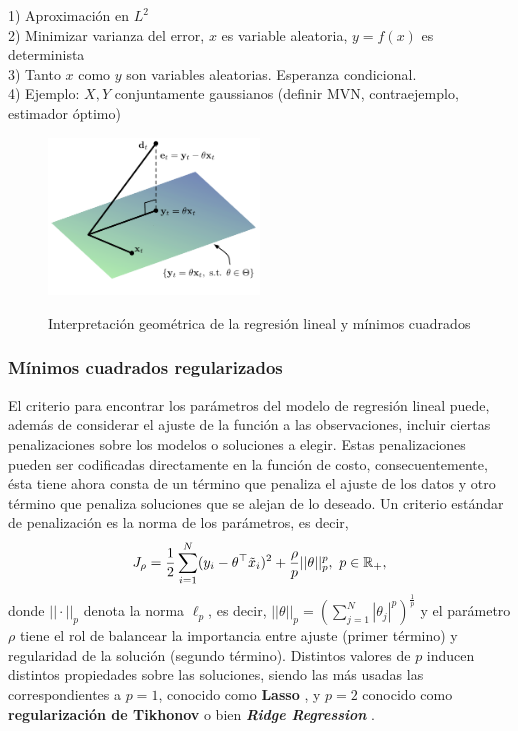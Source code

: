 \begin{mdframed}[style=pendiente, frametitle={\center ¿Por qué usamos el criterio de mínimos cuadrados?}]
1) Aproximación en $L^2$\\
2) Minimizar varianza del error, $x$ es variable aleatoria, $y=f(x)$ es determinista\\
3) Tanto $x$ como $y$ son variables aleatorias. Esperanza condicional.\\
4) Ejemplo: $X,Y$ conjuntamente gaussianos (definir MVN, contraejemplo, estimador óptimo)

	
\end{mdframed}


\begin{figure}[ht]
	\centering
	\includegraphics[width=0.5\textwidth]{img/projection.pdf}\\
	\caption{Interpretación geométrica de la regresión lineal y mínimos cuadrados}
	\label{fig:projection}
\end{figure}


\subsubsection{Mínimos cuadrados regularizados} %
\label{ssub:min_cuad_reg}

El criterio para encontrar los parámetros del modelo de regresión lineal puede, además de considerar el ajuste de la función a las observaciones, incluir ciertas penalizaciones sobre los modelos o soluciones a elegir. Estas penalizaciones pueden ser codificadas directamente en la función de costo, consecuentemente, ésta tiene ahora consta de un término que penaliza el ajuste de los datos y otro término que penaliza soluciones que se alejan de lo deseado. Un criterio estándar de penalización es la norma de los parámetros, es decir, 
\begin{equation}
	J_\rho = \frac{1}{2}\sum_{i=1}^N(y_i-\theta^
	\top \tilde{x}_i)^2 + \frac{\rho}{p}||\theta||_p^p,\ p\in{\mathbb R}_+,
	\label{eq:reg_least_squares}
\end{equation} 
donde $||\cdot||_p$ denota la norma $\ell_p$, es decir, $||\theta||_p=\left(\sum_{j=1}^N|\theta_j|^p\right)^\frac{1}{p}$ y el parámetro $\rho$ tiene el rol de balancear la importancia entre ajuste (primer término) y regularidad de la solución (segundo término). Distintos valores de $p$ inducen distintos propiedades sobre las soluciones, siendo las más usadas las correspondientes a $p=1$, conocido como \textbf{Lasso} \cite{tibshirani_1996}, y $p=2$ conocido como \textbf{regularización de Tikhonov} \cite{tikhonov_arsenin_1977} o bien \textbf{\emph{Ridge Regression}} \cite{hoerl_kennard_1970}.  

